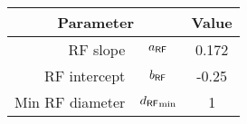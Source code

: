 \begin{tabular}{rcc}
\hline
\multicolumn{2}{c}{\textbf{Parameter}} &  \textbf{Value} 
\\ \hline
RF slope & \textbf{${a_\mathsf{RF}}$} & 0.172
\\ 
RF intercept & \textbf{${b_\mathsf{RF}}$} & -0.25
\\ 
Min RF diameter & \textbf{${{d_\mathsf{RF}}_{\min}}$} & 1
\\ \hline
\end{tabular}